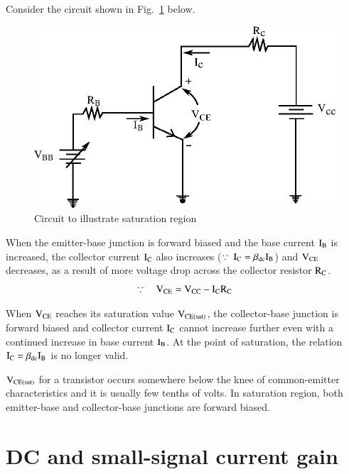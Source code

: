 Consider the circuit shown in Fig.~\ref{fig2.18} below.
\begin{figure}[H]
\centering
\includegraphics{chap2/fig18.eps}
\smallskip
\caption{Circuit to illustrate saturation region}\label{fig2.18}
\end{figure}

\eject

When the emitter-base junction is forward biased and the base current $\textrm{I}_{\textrm{B}}$ is increased, the collector current $\textrm{I}_{\textrm{C}}$ also increases ($\because ~ \textrm{I}_{\textrm{C}}=\beta_{\text{dc}}\textrm{I}_{\textrm{B}}$) and $\textrm{V}_{\text{CE}}$ decreases, as a result of more voltage drop across the collector resistor $\textrm{R}_{\textrm{C}}$.
$$
\because\quad \textrm{V}_{\text{CE}}=\textrm{V}_{\text{CC}}-\textrm{I}_{\textrm{C}}\textrm{R}_{\textrm{C}}
$$

When $\textrm{V}_{\text{CE}}$ reaches its saturation value $\textrm{V}_{\text{CE(sat)}}$, the collector-base junction is forward biased and collector current $\textrm{I}_{\textrm{C}}$ cannot increase further even with a continued increase in base current $\textrm{I}_{\textrm{B}}$. At the point of saturation, the relation $\textrm{I}_{\textrm{C}}=\beta_{\text{dc}}\textrm{I}_{\textrm{B}}$ is no longer valid.

$\textrm{V}_{\text{CE(sat)}}$ for a transistor occurs somewhere below the knee of common-emitter characteristics and it is usually few tenths of volts. In saturation region, both emitter-base and collector-base junctions are forward biased.

\section{DC and small-signal current gain}\label{sec2.6}

